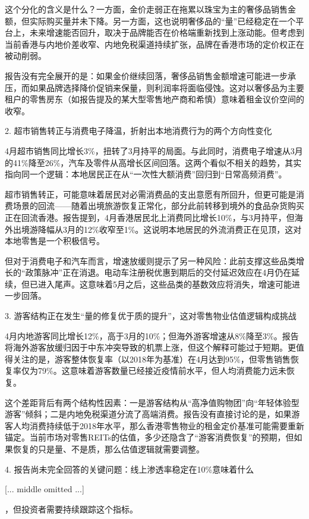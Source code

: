 \documentclass[11pt]{ctexart}
\begin{document}
这个分化的含义是什么？一方面，金价走弱正在拖累以珠宝为主的奢侈品销售金额，但实际购买量并未下降。另一方面，这也说明奢侈品的“量”已经稳定在一个平台上，未来增速能否回升，取决于品牌能否在价格端重新找到上涨动能。但考虑到当前香港与内地价差收窄、内地免税渠道持续扩张，品牌在香港市场的定价权正在被动削弱。

报告没有完全展开的是：如果金价继续回落，奢侈品销售金额增速可能进一步承压，而如果品牌选择降价促销来保量，则利润率将面临侵蚀。这对以奢侈品为主要租户的零售房东（如报告提及的某大型零售地产商和希慎）意味着租金议价空间的收窄。

2. 超市销售转正与消费电子降温，折射出本地消费行为的两个方向性变化

4月超市销售同比增长3\%，扭转了3月持平的局面。与此同时，消费电子增速从3月的41\%降至26\%，汽车及零件从高增长区间回落。这两个看似不相关的趋势，其实指向同一个逻辑：本地居民正在从“一次性大额消费”回归到“日常高频消费”。

超市销售转正，可能意味着居民对必需消费品的支出意愿有所回升，但更可能是消费场景的回流——随着出境旅游恢复正常化，部分此前转移到境外的食品杂货购买正在回流香港。报告提到，4月香港居民北上消费同比增长10\%，与3月持平，但海外出境游降幅从3月的12\%收窄至1\%。这说明本地居民的外流消费正在见顶，这对本地零售是一个积极信号。

但对于消费电子和汽车而言，增速放缓则提示了另一种风险：此前支撑这些品类增长的“政策脉冲”正在消退。电动车注册税优惠到期后的交付延迟效应在4月仍在延续，但已进入尾声。这意味着5月之后，这些品类的基数效应将消失，增速可能进一步回落。

3. 游客结构正在发生“量的修复优于质的提升”，这对零售物业估值逻辑构成挑战

4月内地游客同比增长12\%，高于3月的10\%；但海外游客增速从8\%降至3\%。报告将海外游客放缓归因于中东冲突导致的机票上涨，但这个解释可能过于短期。更值得关注的是，游客整体恢复率（以2018年为基准）在4月达到95\%，但零售销售恢复率仅为79\%。这意味着游客数量已经接近疫情前水平，但人均消费能力远未恢复。

这个差距背后有两个结构性因素：一是游客结构从“高净值购物团”向“年轻体验型游客”倾斜；二是内地免税渠道分流了高端消费。报告没有直接讨论的是，如果游客人均消费持续低于2018年水平，那么香港零售物业的租金定价基准可能需要重新锚定。当前市场对零售REITs的估值，多少还隐含了“游客消费恢复”的预期，但如果恢复的只是量、不是质，那么估值逻辑就需要调整。

4. 报告尚未完全回答的关键问题：线上渗透率稳定在10\%意味着什么


[... middle omitted ...]

，但投资者需要持续跟踪这个指标。
\end{document}
